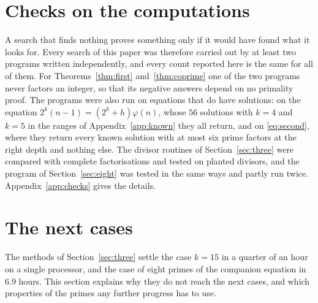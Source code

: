 \documentclass[11pt,reqno]{amsart}
\numberwithin{equation}{section}
\theoremstyle{plain}
\theoremstyle{definition}
\theoremstyle{remark}
\begin{document}
\section{Checks on the computations}\label{sec:checks}

A search that finds nothing proves something only if it would have
found what it looks for. Every search of this paper was therefore
carried out by at least two programs written independently, and every
count reported here is the same for all of them. For
Theorems~\ref{thm:first} and~\ref{thm:coprime} one of the two programs
never factors an integer, so that its negative answers depend on no
primality proof. The programs were also run on equations that do have
solutions: on the equation $2^k(n-1)=(2^k+h)\varphi(n)$, whose $56$
solutions with $k=4$ and $k=5$ in the ranges of
Appendix~\ref{app:known} they all return, and on \eqref{eq:second},
where they return every known solution with at most six prime factors
at the right depth and nothing else. The divisor routines of
Section~\ref{sec:three} were compared with complete factorisations and
tested on planted divisors, and the program of Section~\ref{sec:eight}
was tested in the same ways and partly run twice.
Appendix~\ref{app:checks} gives the details.

\section{The next cases}\label{sec:walls}

The methods of Section~\ref{sec:three} settle the case $k=15$ in a
quarter of an hour on a single processor, and the case of eight primes
of the companion equation in $6.9$ hours. This section explains why
they do not reach the next cases, and which properties of the primes
any further progress has to use.
\end{document}
